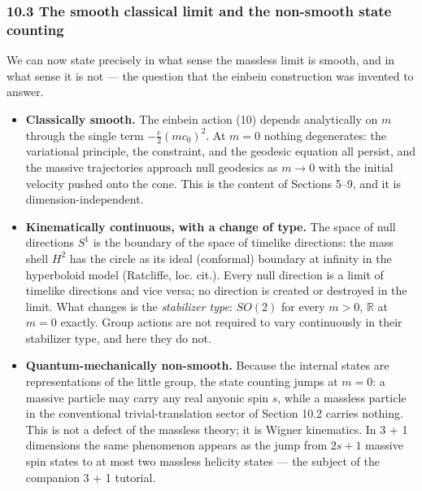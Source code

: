 \documentclass[
]{article}
\providecommand{\tightlist}{%
  \setlength{\itemsep}{0pt}\setlength{\parskip}{0pt}}
\begin{document}
\hypertarget{the-smooth-classical-limit-and-the-non-smooth-state-counting}{%
\subsubsection{10.3 The smooth classical limit and the non-smooth state
counting}\label{the-smooth-classical-limit-and-the-non-smooth-state-counting}}

We can now state precisely in what sense the massless limit is smooth,
and in what sense it is not --- the question that the einbein
construction was invented to answer.

\begin{itemize}
\tightlist
\item
  \textbf{Classically smooth.} The einbein action (10) depends
  analytically on \(m\) through the single term
  \(- \frac{e}{2}(mc_{0})^{2}\). At \(m = 0\) nothing degenerates: the
  variational principle, the constraint, and the geodesic equation all
  persist, and the massive trajectories approach null geodesics as
  \(m \to 0\) with the initial velocity pushed onto the cone. This is
  the content of Sections 5--9, and it is dimension-independent.
\item
  \textbf{Kinematically continuous, with a change of type.} The space of
  null directions \(S^{1}\) is the boundary of the space of timelike
  directions: the mass shell \(H^{2}\) has the circle as its ideal
  (conformal) boundary at infinity in the hyperboloid model (Ratcliffe,
  loc. cit.). Every null direction is a limit of timelike directions and
  vice versa; no direction is created or destroyed in the limit. What
  changes is the \emph{stabilizer type}: \(SO(2)\) for every \(m > 0\),
  \(\mathbb{R}\) at \(m = 0\) exactly. Group actions are not required to
  vary continuously in their stabilizer type, and here they do not.
\item
  \textbf{Quantum-mechanically non-smooth.} Because the internal states
  are representations of the little group, the state counting jumps at
  \(m = 0\): a massive particle may carry any real anyonic spin \(s\),
  while a massless particle in the conventional trivial-translation
  sector of Section 10.2 carries nothing. This is not a defect of the
  massless theory; it is Wigner kinematics. In 3 + 1 dimensions the same
  phenomenon appears as the jump from \(2s + 1\) massive spin states to
  at most two massless helicity states --- the subject of the companion
  3 + 1 tutorial.
\end{itemize}
\end{document}
